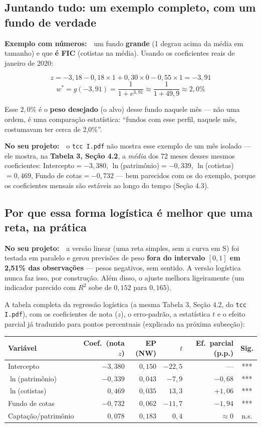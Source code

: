 \documentclass[11pt,a4paper]{article}
\newcommand{\exemplo}[0]{\par\vspace{4pt}\noindent\textbf{\color{vermelho}Exemplo com números:}\ }
\newcommand{\noprojeto}[0]{\par\vspace{4pt}\noindent\textbf{No seu projeto:}\ }
\begin{document}
\subsection{Juntando tudo: um exemplo completo, com um fundo de verdade}

\exemplo\ um fundo \textbf{grande} (1 degrau acima da média em tamanho) e que \textbf{é FIC}
(cotistas na média). Usando os coeficientes reais de janeiro de 2020:

$$z = -3{,}18 - 0{,}18\times 1 + 0{,}30\times 0 - 0{,}55\times 1 = -3{,}91$$
$$w^* = g(-3{,}91) = \frac{1}{1+e^{3{,}91}} \approx \frac{1}{1+49{,}9} \approx 2{,}0\%$$

Esse $2{,}0\%$ é o \textbf{peso desejado} (o alvo) desse fundo naquele mês --- não uma ordem, é
uma comparação estatística: ``fundos com esse perfil, naquele mês, costumavam ter cerca de
2,0\%''.

\noprojeto\ o \texttt{tcc I.pdf} não mostra esse exemplo de um mês isolado --- ele mostra, na
\textbf{Tabela 3, Seção 4.2}, a \emph{média} dos 72 meses desses mesmos coeficientes:
Intercepto$=-3{,}380$, $\ln$(patrimônio)$=-0{,}339$, $\ln$(cotistas)$=0{,}469$, Fundo de
cotas$=-0{,}732$ --- bem parecidos com os do exemplo, porque os coeficientes mensais são
estáveis ao longo do tempo (Seção 4.3).

\subsection{Por que essa forma logística é melhor que uma reta, na prática}

\noprojeto\ a versão linear (uma reta simples, sem a curva em S) foi testada em paralelo e gerou
previsões de peso \textbf{fora do intervalo $[0,1]$ em 2,51\% das observações} --- pesos
negativos, sem sentido. A versão logística nunca faz isso, por construção. Além disso, o ajuste
melhora ligeiramente (um indicador parecido com $R^2$ sobe de $0{,}152$ para $0{,}165$).

A tabela completa da regressão logística (a mesma Tabela 3, Seção 4.2, do \texttt{tcc I.pdf}),
com os coeficientes de nota ($z$), o erro-padrão, a estatística $t$ e o efeito parcial já
traduzido para pontos percentuais (explicado na próxima subseção):

\begin{center}\footnotesize
\begin{tabular}{@{}lrrrrc@{}}
\toprule
Variável & Coef.\ (nota $z$) & EP (NW) & $t$ & Ef.\ parcial (p.p.) & Sig. \\
\midrule
Intercepto              & $-3{,}380$ & $0{,}150$ & $-22{,}5$ & --- & *** \\
$\ln$(patrimônio)       & $-0{,}339$ & $0{,}043$ & $-7{,}9$  & $-0{,}68$ & *** \\
$\ln$(cotistas)         & $0{,}469$  & $0{,}035$ & $13{,}3$  & $+1{,}06$ & *** \\
Fundo de cotas           & $-0{,}732$ & $0{,}062$ & $-11{,}7$ & $-1{,}94$ & *** \\
Captação/patrimônio     & $0{,}078$  & $0{,}183$ & $0{,}4$   & $\approx 0$ & n.s. \\
\bottomrule
\end{tabular}
\end{center}
\end{document}

